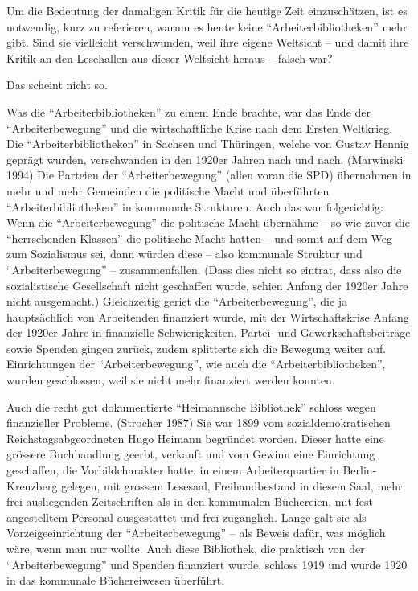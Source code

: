 \documentclass[a4paper,
fontsize=11pt,
oneside,
numbers=noperiodatend,
parskip=half-,
bibliography=totoc,
final
]{scrartcl}
\begin{document}
Um die Bedeutung der damaligen Kritik für die heutige Zeit
einzuschätzen, ist es notwendig, kurz zu referieren, warum es heute
keine \enquote{Arbeiterbibliotheken} mehr gibt. Sind sie vielleicht
verschwunden, weil ihre eigene Weltsicht -- und damit ihre Kritik an den
Lesehallen aus dieser Weltsicht heraus -- falsch war?

Das scheint nicht so.

Was die \enquote{Arbeiterbibliotheken} zu einem Ende brachte, war das
Ende der \enquote{Arbeiterbewegung} und die wirtschaftliche Krise nach
dem Ersten Weltkrieg. Die \enquote{Arbeiterbibliotheken} in Sachsen und
Thüringen, welche von Gustav Hennig geprägt wurden, verschwanden in den
1920er Jahren nach und nach. (Marwinski 1994) Die Parteien der
\enquote{Arbeiterbewegung} (allen voran die SPD) übernahmen in mehr und
mehr Gemeinden die politische Macht und überführten
\enquote{Arbeiterbibliotheken} in kommunale Strukturen. Auch das war
folgerichtig: Wenn die \enquote{Arbeiterbewegung} die politische Macht
übernähme -- so wie zuvor die \enquote{herrschenden Klassen} die
politische Macht hatten -- und somit auf dem Weg zum Sozialismus sei,
dann würden diese -- also kommunale Struktur und
\enquote{Arbeiterbewegung} -- zusammenfallen. (Dass dies nicht so
eintrat, dass also die sozialistische Gesellschaft nicht geschaffen
wurde, schien Anfang der 1920er Jahre nicht ausgemacht.) Gleichzeitig
geriet die \enquote{Arbeiterbewegung}, die ja hauptsächlich von
Arbeitenden finanziert wurde, mit der Wirtschaftskrise Anfang der 1920er
Jahre in finanzielle Schwierigkeiten. Partei- und Gewerkschaftsbeiträge
sowie Spenden gingen zurück, zudem splitterte sich die Bewegung weiter
auf. Einrichtungen der \enquote{Arbeiterbewegung}, wie auch die
\enquote{Arbeiterbibliotheken}, wurden geschlossen, weil sie nicht mehr
finanziert werden konnten.

Auch die recht gut dokumentierte \enquote{Heimannsche Bibliothek}
schloss wegen finanzieller Probleme. (Strocher 1987) Sie war 1899 vom
sozialdemokratischen Reichstagsabgeordneten Hugo Heimann begründet
worden. Dieser hatte eine grössere Buchhandlung geerbt, verkauft und vom
Gewinn eine Einrichtung geschaffen, die Vorbildcharakter hatte: in einem
Arbeiterquartier in Berlin-Kreuzberg gelegen, mit grossem Lesesaal,
Freihandbestand in diesem Saal, mehr frei ausliegenden Zeitschriften als
in den kommunalen Büchereien, mit fest angestelltem Personal
ausgestattet und frei zugänglich. Lange galt sie als Vorzeigeeinrichtung
der \enquote{Arbeiterbewegung} -- als Beweis dafür, was möglich wäre,
wenn man nur wollte. Auch diese Bibliothek, die praktisch von der
\enquote{Arbeiterbewegung} und Spenden finanziert wurde, schloss 1919
und wurde 1920 in das kommunale Büchereiwesen überführt.
\end{document}
